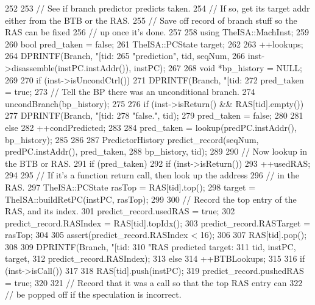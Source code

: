 \begin{DoxyCode}
252 {
253     // See if branch predictor predicts taken.
254     // If so, get its target addr either from the BTB or the RAS.
255     // Save off record of branch stuff so the RAS can be fixed
256     // up once it's done.
257 
258     using TheISA::MachInst;
259 
260     bool pred_taken = false;
261     TheISA::PCState target;
262 
263     ++lookups;
264     DPRINTF(Branch, "[tid:%
265             "prediction\n", tid, seqNum,
266             inst->disassemble(instPC.instAddr()), instPC);
267 
268     void *bp_history = NULL;
269 
270     if (inst->isUncondCtrl()) {
271         DPRINTF(Branch, "[tid:%
272         pred_taken = true;
273         // Tell the BP there was an unconditional branch.
274         uncondBranch(bp_history);
275 
276         if (inst->isReturn() && RAS[tid].empty()) {
277             DPRINTF(Branch, "[tid:%
278                     "false.\n", tid);
279             pred_taken = false;
280         }
281     } else {
282         ++condPredicted;
283 
284         pred_taken = lookup(predPC.instAddr(), bp_history);
285     }
286 
287     PredictorHistory predict_record(seqNum, predPC.instAddr(), pred_taken,
288                                     bp_history, tid);
289 
290     // Now lookup in the BTB or RAS.
291     if (pred_taken) {
292         if (inst->isReturn()) {
293             ++usedRAS;
294 
295             // If it's a function return call, then look up the address
296             // in the RAS.
297             TheISA::PCState rasTop = RAS[tid].top();
298             target = TheISA::buildRetPC(instPC, rasTop);
299 
300             // Record the top entry of the RAS, and its index.
301             predict_record.usedRAS = true;
302             predict_record.RASIndex = RAS[tid].topIdx();
303             predict_record.RASTarget = rasTop;
304 
305             assert(predict_record.RASIndex < 16);
306 
307             RAS[tid].pop();
308 
309             DPRINTF(Branch, "[tid:%
310                     "RAS predicted target: %
311                     tid, instPC, target,
312                     predict_record.RASIndex);
313         } else {
314             ++BTBLookups;
315 
316             if (inst->isCall()) {
317 
318                 RAS[tid].push(instPC);
319                 predict_record.pushedRAS = true;
320 
321                 // Record that it was a call so that the top RAS entry can
322                 // be popped off if the speculation is incorrect.
}}}}
\end{DoxyCode}
